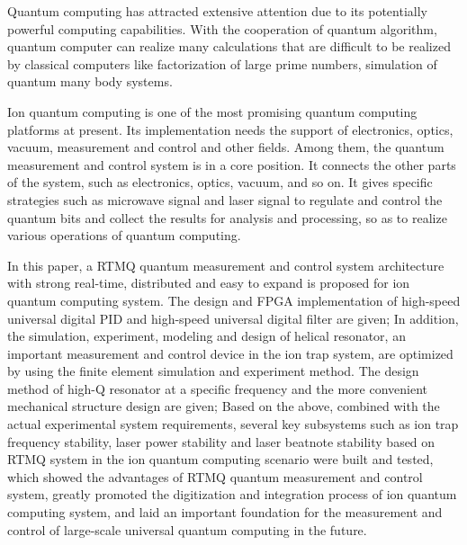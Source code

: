 \begin{abstract*}
  Quantum computing has attracted extensive attention due to its potentially powerful computing capabilities. With the cooperation of quantum algorithm, quantum computer can realize many calculations that are difficult to be realized by classical computers like factorization of large prime numbers, simulation of quantum many body systems. 

  Ion quantum computing is one of the most promising quantum computing platforms at present. Its implementation needs the support of electronics, optics, vacuum, measurement and control and other fields. Among them, the quantum measurement and control system is in a core position. It connects the other parts of the system, such as electronics, optics, vacuum, and so on. It gives specific strategies such as microwave signal and laser signal to regulate and control the quantum bits and collect the results for analysis and processing, so as to realize various operations of quantum computing.

In this paper, a RTMQ quantum measurement and control system architecture with strong real-time, distributed and easy to expand is proposed for ion quantum computing system. The design and FPGA implementation of high-speed universal digital PID and high-speed universal digital filter are given;
In addition, the simulation, experiment, modeling and design of helical resonator, an important measurement and control device in the ion trap system, are optimized by using the finite element simulation and experiment method. The design method of high-Q resonator at a specific frequency and the more convenient mechanical structure design are given;
Based on the above, combined with the actual experimental system requirements, several key subsystems such as ion trap frequency stability, laser power stability and laser beatnote stability based on RTMQ system in the ion quantum computing scenario were built and tested, which showed the advantages of RTMQ quantum measurement and control system, greatly promoted the digitization and integration process of ion quantum computing system, and laid an important foundation for the measurement and control of large-scale universal quantum computing in the future.


\end{abstract*}
